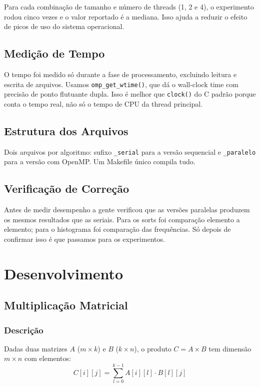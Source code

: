 \documentclass[12pt]{article}
\begin{document}
Para cada combinação de tamanho e número de threads (1, 2 e 4), o experimento rodou cinco vezes e o valor reportado é a mediana. Isso ajuda a reduzir o efeito de picos de uso do sistema operacional.

\subsection{Medição de Tempo}

O tempo foi medido só durante a fase de processamento, excluindo leitura e escrita de arquivos. Usamos \texttt{omp\_get\_wtime()}, que dá o wall-clock time com precisão de ponto flutuante dupla. Isso é melhor que \texttt{clock()} do C padrão porque conta o tempo real, não só o tempo de CPU da thread principal.

\subsection{Estrutura dos Arquivos}

Dois arquivos por algoritmo: sufixo \texttt{\_serial} para a versão sequencial e \texttt{\_paralelo} para a versão com OpenMP. Um Makefile único compila tudo.

\subsection{Verificação de Correção}

Antes de medir desempenho a gente verificou que as versões paralelas produzem os mesmos resultados que as seriais. Para os sorts foi comparação elemento a elemento; para o histograma foi comparação das frequências. Só depois de confirmar isso é que passamos para os experimentos.

\section{Desenvolvimento}

\subsection{Multiplicação Matricial}

\subsubsection{Descrição}

Dadas duas matrizes $A$ ($m \times k$) e $B$ ($k \times n$), o produto $C = A \times B$ tem dimensão $m \times n$ com elementos:
\begin{equation}
C[i][j] = \sum_{l=0}^{k-1} A[i][l] \cdot B[l][j]
\end{equation}
\end{document}
